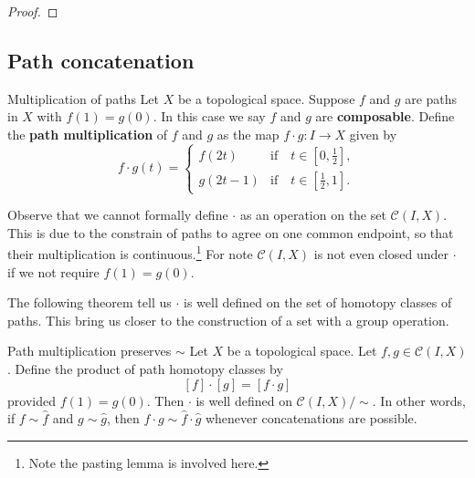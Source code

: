 \begin{proof}
\end{proof}



\subsection*{Path concatenation}

\begin{definition}{Multiplication of paths}{}
    Let \(X\) be a topological space. Suppose \(f\) and \(g\) are paths in \(X\) with \(f(1)=g(0)\). In this case we say \(f\) and \(g\) are \textbf{composable}.
    Define   the \textbf{path multiplication} of \(f\) and \(g\) as the map \(f\cdot g\colon I\to X\) given by 
      \[
        f \cdot g (t)= \begin{cases}
            f(2t)   &\text{if}\quad t\in [0,\frac{1}{2}],\\
            g(2t-1) &\text{if}\quad t\in [\frac{1}{2},1].
        \end{cases}
    \] 
\end{definition}

Observe that we cannot formally define \(\cdot\) as an operation on the set \(\mathcal{C}(I,X)\). This is due to the constrain of paths  to agree on one common endpoint, so that their multiplication is continuous.\footnote{Note the pasting lemma is involved here. } For note \(\mathcal{C}(I,X)\) is not even closed under \(\cdot\)  if we not require \(f(1)=g(0)\). 






The following theorem tell us \(\cdot\) is well defined on the set of homotopy classes of paths. This bring us closer to   the construction of a set with a group operation.

\begin{theorem}{Path multiplication  preserves  \(\sim\)}{}
    Let \(X\) be a topological space. Let \(f,g\in \mathcal{C}(I,X)\). Define the product of path homotopy classes  by \[
        [f] \cdot [g] = [f\cdot g]
    \]   provided \(f(1)=g(0)\). Then \(\cdot\) is well defined on \(\mathcal{C}(I,X)/\!\!\sim\). In other words, if \(f\sim \hat{f}\) and \(g\sim \hat{g}\), then \(f\cdot g\sim \hat{f}\cdot\hat{g}\) whenever concatenations are possible.
\end{theorem}

